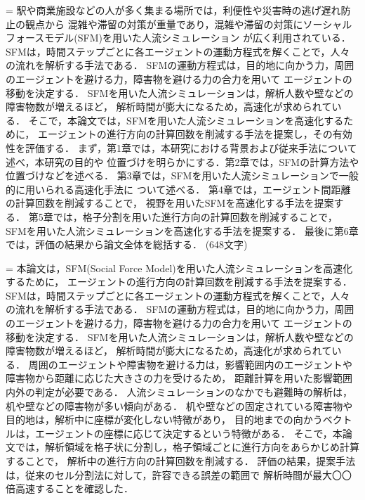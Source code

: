 ={
駅や商業施設などの人が多く集まる場所では，利便性や災害時の逃げ遅れ防止の観点から
混雑や滞留の対策が重量であり，混雑や滞留の対策にソーシャルフォースモデル(SFM)を用いた人流シミュレーション
が広く利用されている．
SFMは，時間ステップごとに各エージェントの運動方程式を解くことで，人々の流れを解析する手法である．
SFMの運動方程式は，目的地に向かう力，周囲のエージェントを避ける力，障害物を避ける力の合力を用いて
エージェントの移動を決定する．
SFMを用いた人流シミュレーションは，解析人数や壁などの障害物数が増えるほど，
解析時間が膨大になるため，高速化が求められている．
そこで，本論文では，SFMを用いた人流シミュレーションを高速化するために，
エージェントの進行方向の計算回数を削減する手法を提案し，その有効性を評価する．
まず，第1章では，本研究における背景および従来手法について述べ，本研究の目的や
位置づけを明らかにする．第2章では，SFMの計算方法や位置づけなどを述べる．
第3章では，SFMを用いた人流シミュレーションで一般的に用いられる高速化手法に
ついて述べる．
第4章では，エージェント間距離の計算回数を削減することで，
視野を用いたSFMを高速化する手法を提案する．
第5章では，格子分割を用いた進行方向の計算回数を削減することで，
SFMを用いた人流シミュレーションを高速化する手法を提案する．
最後に第6章では，評価の結果から論文全体を総括する．
(648文字)
}

\fi


={
本論文は，SFM(Social Force Model)を用いた人流シミュレーションを高速化するために，
エージェントの進行方向の計算回数を削減する手法を提案する．
SFMは，時間ステップごとに各エージェントの運動方程式を解くことで，人々の流れを解析する手法である．
SFMの運動方程式は，目的地に向かう力，周囲のエージェントを避ける力，障害物を避ける力の合力を用いて
エージェントの移動を決定する．
SFMを用いた人流シミュレーションは，解析人数や壁などの障害物数が増えるほど，
解析時間が膨大になるため，高速化が求められている．
周囲のエージェントや障害物を避ける力は，影響範囲内のエージェントや障害物から距離に応じた大きさの力を受けるため，
距離計算を用いた影響範囲内外の判定が必要である．
人流シミュレーションのなかでも避難時の解析は，机や壁などの障害物が多い傾向がある．
机や壁などの固定されている障害物や目的地は，解析中に座標が変化しない特徴があり，
目的地までの向かうベクトルは，エージェントの座標に応じて決定するという特徴がある．
そこで，本論文では，解析領域を格子状に分割し，格子領域ごとに進行方向をあらかじめ計算することで，
解析中の進行方向の計算回数を削減する．
評価の結果，提案手法は，従来のセル分割法に対して，許容できる誤差の範囲で
解析時間が最大〇〇倍高速することを確認した．
}
\fi


